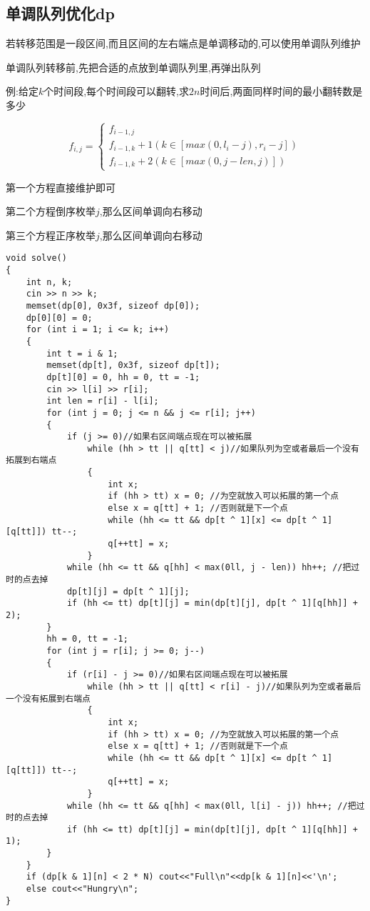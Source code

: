 \documentclass[a4paper, fontset=none]{ctexart}
\begin{document}
\subsection{单调队列优化dp}
若转移范围是一段区间,而且区间的左右端点是单调移动的,可以使用单调队列维护

单调队列转移前,先把合适的点放到单调队列里,再弹出队列

例:给定$k$个时间段,每个时间段可以翻转,求$2n$时间后,两面同样时间的最小翻转数是多少

\begin{equation}  
f_{i, j}=\left\{  
        \begin{array}{lr}
        f_{i-1, j}\\
        f_{i-1, k}+1(k\in[max(0, l_i-j), r_i-j])\\
        f_{i-1, k}+2(k\in[max(0, j-len, j)])
        \end{array}  
\right.  
\end{equation} 

第一个方程直接维护即可

第二个方程倒序枚举$j$,那么区间单调向右移动

第三个方程正序枚举$j$,那么区间单调向右移动


\begin{verbatim}
void solve()
{
    int n, k;
    cin >> n >> k;
    memset(dp[0], 0x3f, sizeof dp[0]);
    dp[0][0] = 0;
    for (int i = 1; i <= k; i++)
    {
        int t = i & 1;
        memset(dp[t], 0x3f, sizeof dp[t]);
        dp[t][0] = 0, hh = 0, tt = -1;
        cin >> l[i] >> r[i];
        int len = r[i] - l[i];
        for (int j = 0; j <= n && j <= r[i]; j++)
        {
            if (j >= 0)//如果右区间端点现在可以被拓展
                while (hh > tt || q[tt] < j)//如果队列为空或者最后一个没有拓展到右端点
                {
                    int x;
                    if (hh > tt) x = 0; //为空就放入可以拓展的第一个点
                    else x = q[tt] + 1; //否则就是下一个点
                    while (hh <= tt && dp[t ^ 1][x] <= dp[t ^ 1][q[tt]]) tt--;
                    q[++tt] = x;
                }
            while (hh <= tt && q[hh] < max(0ll, j - len)) hh++; //把过时的点去掉
            dp[t][j] = dp[t ^ 1][j];
            if (hh <= tt) dp[t][j] = min(dp[t][j], dp[t ^ 1][q[hh]] + 2);
        }
        hh = 0, tt = -1;
        for (int j = r[i]; j >= 0; j--)
        {
            if (r[i] - j >= 0)//如果右区间端点现在可以被拓展
                while (hh > tt || q[tt] < r[i] - j)//如果队列为空或者最后一个没有拓展到右端点
                {
                    int x;
                    if (hh > tt) x = 0; //为空就放入可以拓展的第一个点
                    else x = q[tt] + 1; //否则就是下一个点
                    while (hh <= tt && dp[t ^ 1][x] <= dp[t ^ 1][q[tt]]) tt--;
                    q[++tt] = x;
                }
            while (hh <= tt && q[hh] < max(0ll, l[i] - j)) hh++; //把过时的点去掉
            if (hh <= tt) dp[t][j] = min(dp[t][j], dp[t ^ 1][q[hh]] + 1);
        }
    }
    if (dp[k & 1][n] < 2 * N) cout<<"Full\n"<<dp[k & 1][n]<<'\n';
    else cout<<"Hungry\n";
}
\end{verbatim}
\end{document}
